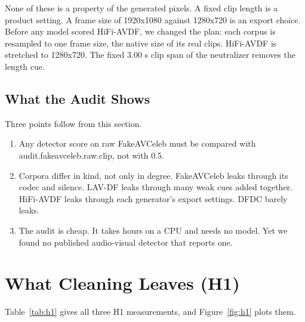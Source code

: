None of these is a property of the generated pixels. A fixed clip length is a
product setting. A frame size of 1920x1080 against 1280x720 is an export
choice. Before any model scored HiFi-AVDF, we changed the plan: each
corpus is resampled to one frame size, the native size of its real clips.
HiFi-AVDF is stretched to 1280x720. The fixed 3.00 s clip span of the
neutralizer removes the length cue.

\subsection{What the Audit Shows}

Three points follow from this section.

\begin{enumerate}
    \item Any detector score on raw FakeAVCeleb must be compared with
    {{audit.fakeavceleb.raw.clip}}, not with 0.5.
    \item Corpora differ in kind, not only in degree. FakeAVCeleb leaks through
    its codec and silence. LAV-DF leaks through many weak cues added together.
    HiFi-AVDF leaks through each generator's export settings. DFDC barely leaks.
    \item The audit is cheap. It takes hours on a CPU and needs no model. Yet
    we found no published audio-visual detector that reports one.
\end{enumerate}

\section{What Cleaning Leaves (H1)}
\label{sec:r-h1}

Table~\ref{tab:h1} gives all three H1 measurements, and
Figure~\ref{fig:h1} plots them.

